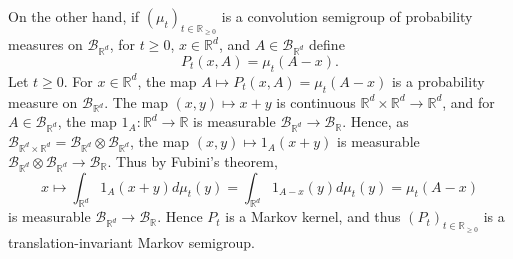 \documentclass{article}
\theoremstyle{definition}
\begin{document}
On the other hand, if  $(\mu_t)_{t \in \mathbb{R}_{\geq 0}}$ is a convolution semigroup of probability measures
on $\mathscr{B}_{\mathbb{R}^d}$,
for $t \geq 0$, $x \in \mathbb{R}^d$, and $A \in \mathscr{B}_{\mathbb{R}^d}$ define
\[
P_t(x,A) = \mu_t(A-x).
\]
Let $t \geq 0$. For $x \in \mathbb{R}^d$,
the map $A \mapsto P_t(x,A) = \mu_t(A-x)$ is a probability measure on  $\mathscr{B}_{\mathbb{R}^d}$.
The map
$(x,y) \mapsto x+y$ is continuous $\mathbb{R}^d \times \mathbb{R}^d \to \mathbb{R}^d$,
and for $A \in \mathscr{B}_{\mathbb{R}^d}$, 
the map
$1_A:\mathbb{R}^d \to \mathbb{R}$ is 
measurable $\mathscr{B}_{\mathbb{R}^d} \to \mathscr{B}_{\mathbb{R}}$. Hence,
as $\mathscr{B}_{\mathbb{R}^d \times \mathbb{R}^d}=\mathscr{B}_{\mathbb{R}^d}
\otimes \mathscr{B}_{\mathbb{R}^d}$, the map
$(x,y) \mapsto 1_A(x+y)$ is measurable $\mathscr{B}_{\mathbb{R}^d}
\otimes \mathscr{B}_{\mathbb{R}^d}  \to \mathscr{B}_{\mathbb{R}}$. 
Thus by Fubini's theorem,
\[
x \mapsto 
\int_{\mathbb{R}^d} 1_A(x+y) d\mu_t(y)
= \int_{\mathbb{R}^d} 1_{A-x}(y) d\mu_t(y)
=\mu_t(A-x) 
\]
is measurable $\mathscr{B}_{\mathbb{R}^d} \to \mathscr{B}_{\mathbb{R}}$. 
Hence $P_t$ is a Markov kernel, and thus
$(P_t)_{t \in \mathbb{R}_{\geq 0}}$ is a translation-invariant Markov semigroup.
\end{document}
